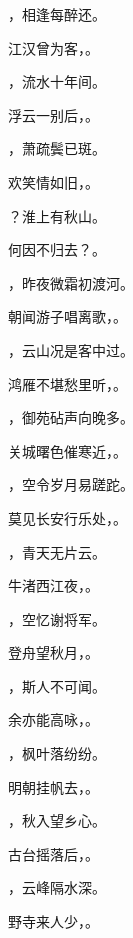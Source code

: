 \documentclass[12pt, a4paper, addpoints]{exam}
\begin{document}
\begin{questions}
\question[1] \uline{\qquad\qquad\qquad}，相逢每醉还。

\question[1] 江汉曾为客，\uline{\qquad\qquad\qquad}。

\question[1] \uline{\qquad\qquad\qquad}，流水十年间。

\question[1] 浮云一别后，\uline{\qquad\qquad\qquad}。

\question[1] \uline{\qquad\qquad\qquad}，萧疏鬓已斑。

\question[1] 欢笑情如旧，\uline{\qquad\qquad\qquad}。

\question[1] \uline{\qquad\qquad\qquad}？淮上有秋山。

\question[1] 何因不归去？\uline{\qquad\qquad\qquad}。

\question[1] \uline{\qquad\qquad\qquad}，昨夜微霜初渡河。

\question[1] 朝闻游子唱离歌，\uline{\qquad\qquad\qquad}。

\question[1] \uline{\qquad\qquad\qquad}，云山况是客中过。

\question[1] 鸿雁不堪愁里听，\uline{\qquad\qquad\qquad}。

\question[1] \uline{\qquad\qquad\qquad}，御苑砧声向晚多。

\question[1] 关城曙色催寒近，\uline{\qquad\qquad\qquad}。

\question[1] \uline{\qquad\qquad\qquad}，空令岁月易蹉跎。

\question[1] 莫见长安行乐处，\uline{\qquad\qquad\qquad}。

\question[1] \uline{\qquad\qquad\qquad}，青天无片云。

\question[1] 牛渚西江夜，\uline{\qquad\qquad\qquad}。

\question[1] \uline{\qquad\qquad\qquad}，空忆谢将军。

\question[1] 登舟望秋月，\uline{\qquad\qquad\qquad}。

\question[1] \uline{\qquad\qquad\qquad}，斯人不可闻。

\question[1] 余亦能高咏，\uline{\qquad\qquad\qquad}。

\question[1] \uline{\qquad\qquad\qquad}，枫叶落纷纷。

\question[1] 明朝挂帆去，\uline{\qquad\qquad\qquad}。

\question[1] \uline{\qquad\qquad\qquad}，秋入望乡心。

\question[1] 古台摇落后，\uline{\qquad\qquad\qquad}。

\question[1] \uline{\qquad\qquad\qquad}，云峰隔水深。

\question[1] 野寺来人少，\uline{\qquad\qquad\qquad}。


\end{questions}
\end{document}
